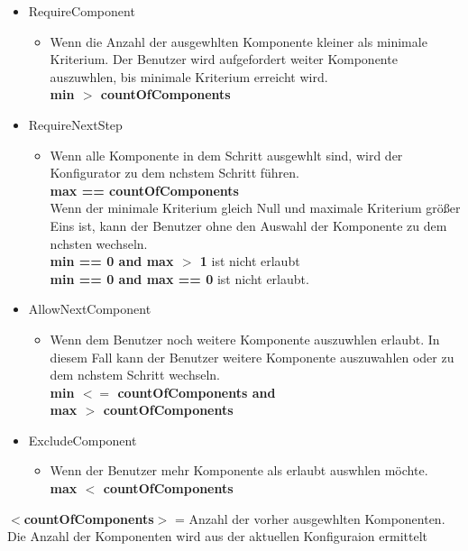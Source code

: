 \documentclass{article}
\begin{document}
\begin{itemize}
    \item RequireComponent
    \begin{itemize}
        \item Wenn die Anzahl der ausgewhlten Komponente kleiner als minimale
        Kriterium. Der Benutzer wird aufgefordert weiter Komponente
        auszuwhlen, bis minimale Kriterium erreicht wird.\\
        \textbf{min $>$ countOfComponents}
    \end{itemize}
    \item RequireNextStep
        \begin{itemize}
            \item Wenn alle Komponente in dem Schritt ausgewhlt sind, wird
            der Konfigurator zu dem nchstem Schritt f\"uhren.\\
            \textbf{max == countOfComponents}\\
            Wenn der minimale Kriterium gleich Null und maximale Kriterium
            gr\"o\ss{}er Eins ist, kann der Benutzer ohne den Auswahl der
            Komponente zu dem nchsten wechseln.\\
            \textbf{min == 0 and max $>$ 1} ist nicht erlaubt\\
            \textbf{min == 0 and max == 0} ist nicht erlaubt.
        \end{itemize}
    \item AllowNextComponent
    \begin{itemize}
        \item  Wenn dem Benutzer noch weitere Komponente auszuwhlen erlaubt.
        In diesem Fall kann der Benutzer weitere Komponente auszuwahlen oder zu
        dem nchstem Schritt wechseln.\\
        \textbf{min $<=$ countOfComponents and\\ max $>$ countOfComponents}
    \end{itemize}
\item ExcludeComponent
    \begin{itemize}
        \item Wenn der Benutzer mehr Komponente als erlaubt auswhlen
        möchte.\\
        \textbf{max $<$ countOfComponents}
    \end{itemize}
\end{itemize}

\noindent\textbf{$<$countOfComponents$>$} = Anzahl der vorher
ausgewhlten Komponenten.
Die Anzahl der Komponenten wird aus der aktuellen Konfiguraion ermittelt\\\\
\end{document}
